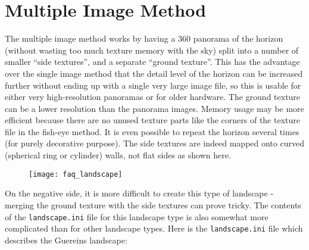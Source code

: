 \section{Multiple Image Method}\label{multiple-image-method}

The multiple image method works by having a 360 panorama of the horizon
(without wasting too much texture memory with the sky) split into a
number of smaller ``side textures'', and a separate ``ground texture''.
This has the advantage over the single image method that the detail
level of the horizon can be increased further without ending up with a
single very large image file, so this is usable for either very
high-resolution panoramas or for older hardware. The ground texture can
be a lower resolution than the panorama images. Memory usage may be more
efficient because there are no unused texture parts like the corners of
the texture file in the fish-eye method. It is even possible to repeat
the horizon several times (for purely decorative purpose). The side
textures are indeed mapped onto curved (spherical ring or cylinder)
walls, not flat sides as shown here.

\begin{figure}[h]
\centering\texttt{[image: faq\_landscape]}
\end{figure}

On the negative side, it is more difficult to create this type of
landscape - merging the ground texture with the side textures can prove
tricky. The contents of the \texttt{landscape.ini} file for this
landscape type is also somewhat more complicated than for other
landscape types. Here is the \texttt{landscape.ini} file which describes
the Guereins landscape:

